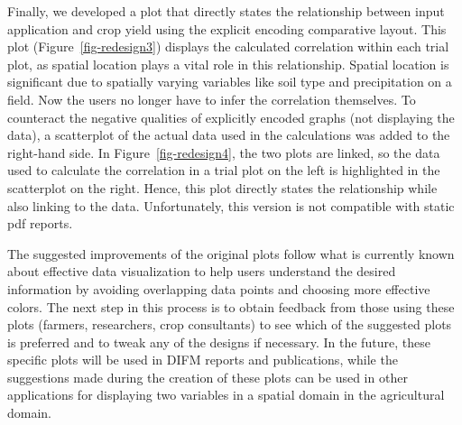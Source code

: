 \documentclass[
  authoryear,
  preprint,
  3p]{elsarticle}
\begin{document}
Finally, we developed a plot that directly states the relationship
between input application and crop yield using the explicit encoding
comparative layout. This plot (Figure~\ref{fig-redesign3}) displays the
calculated correlation within each trial plot, as spatial location plays
a vital role in this relationship. Spatial location is significant due
to spatially varying variables like soil type and precipitation on a
field. Now the users no longer have to infer the correlation themselves.
To counteract the negative qualities of explicitly encoded graphs (not
displaying the data), a scatterplot of the actual data used in the
calculations was added to the right-hand side. In
Figure~\ref{fig-redesign4}, the two plots are linked, so the data used
to calculate the correlation in a trial plot on the left is highlighted
in the scatterplot on the right. Hence, this plot directly states the
relationship while also linking to the data. Unfortunately, this version
is not compatible with static pdf reports.

The suggested improvements of the original plots follow what is
currently known about effective data visualization to help users
understand the desired information by avoiding overlapping data points
and choosing more effective colors. The next step in this process is to
obtain feedback from those using these plots (farmers, researchers, crop
consultants) to see which of the suggested plots is preferred and to
tweak any of the designs if necessary. In the future, these specific
plots will be used in DIFM reports and publications, while the
suggestions made during the creation of these plots can be used in other
applications for displaying two variables in a spatial domain in the
agricultural domain.


\renewcommand\refname{References}
  
\end{document}

